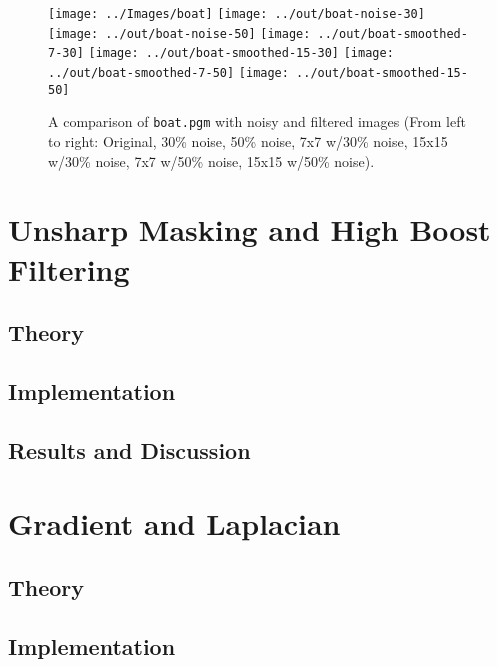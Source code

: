 \documentclass[headings=optiontoheadandtoc,listof=totoc,parskip=full]{scrartcl}
\begin{document}
\begin{figure}[ht]
	\centering
	\texttt{[image: ../Images/boat]}
	\texttt{[image: ../out/boat-noise-30]}
	\texttt{[image: ../out/boat-noise-50]}
	\texttt{[image: ../out/boat-smoothed-7-30]}
	\texttt{[image: ../out/boat-smoothed-15-30]}
	\texttt{[image: ../out/boat-smoothed-7-50]}
	\texttt{[image: ../out/boat-smoothed-15-50]}
	\caption{A comparison of \texttt{boat.pgm} with noisy and filtered images (From left to right: Original, 30\% noise, 50\% noise, 7x7 w/30\% noise, 15x15 w/30\% noise, 7x7 w/50\% noise, 15x15 w/50\% noise).}
	\label{fig:median-result-4}
\end{figure}


\section{Unsharp Masking and High Boost Filtering}
\label{sec:unsharp}


\subsection{Theory}


\subsection{Implementation}


\subsection{Results and Discussion}
\label{sec:unsharp-results}


\section{Gradient and Laplacian}
\label{sec:gradient}

\subsection{Theory}
\label{sec:gradient-theory}


\subsection{Implementation}
\label{sec:gradient-implementation}
\end{document}
